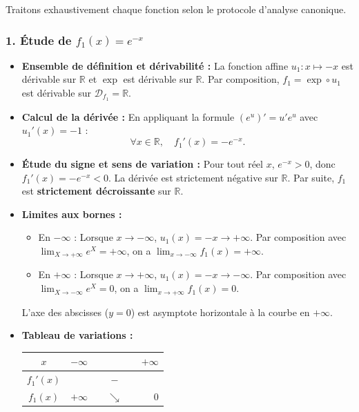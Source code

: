 \documentclass[11pt,a4paper]{article}
\newcommand{\R}{\mathbb{R}}
\begin{document}
\begin{correctionbox}[Exercice 3]
Traitons exhaustivement chaque fonction selon le protocole d'analyse canonique.

\subsubsection*{1. Étude de $f_1(x) = e^{-x}$}
\begin{itemize}
    \item \textbf{Ensemble de définition et dérivabilité :}
    La fonction affine $u_1 : x \mapsto -x$ est dérivable sur $\R$ et $\exp$ est dérivable sur $\R$. Par composition, $f_1 = \exp \circ u_1$ est dérivable sur $\mathcal{D}_{f_1} = \R$.
    \item \textbf{Calcul de la dérivée :}
    En appliquant la formule $(e^u)' = u' e^u$ avec $u_1'(x) = -1$ :
    \[
    \forall x \in \R, \quad f_1'(x) = -e^{-x}.
    \]
    \item \textbf{Étude du signe et sens de variation :}
    Pour tout réel $x$, $e^{-x} > 0$, donc $f_1'(x) = -e^{-x} < 0$. La dérivée est strictement négative sur $\R$. Par suite, $f_1$ est \textbf{strictement décroissante} sur $\R$.
    \item \textbf{Limites aux bornes :}
    \begin{itemize}
        \item En $-\infty$ : Lorsque $x \to -\infty$, $u_1(x) = -x \to +\infty$. Par composition avec $\lim_{X \to +\infty} e^X = +\infty$, on a $\lim_{x \to -\infty} f_1(x) = +\infty$.
        \item En $+\infty$ : Lorsque $x \to +\infty$, $u_1(x) = -x \to -\infty$. Par composition avec $\lim_{X \to -\infty} e^X = 0$, on a $\lim_{x \to +\infty} f_1(x) = 0$.
    \end{itemize}
    L'axe des abscisses ($y = 0$) est asymptote horizontale à la courbe en $+\infty$.
    \item \textbf{Tableau de variations :}
    \begin{center}
    \begin{tabular}{|c|lcccr|}
    \hline
    $x$ & $-\infty$ & & & & $+\infty$ \\
    \hline
    $f_1'(x)$ & & & $-$ & & \\
    \hline
    $f_1(x)$ & $+\infty$ & & $\searrow$ & & $0$ \\
    \hline
    \end{tabular}
    \end{center}
\end{itemize}


\end{correctionbox}
\end{document}
